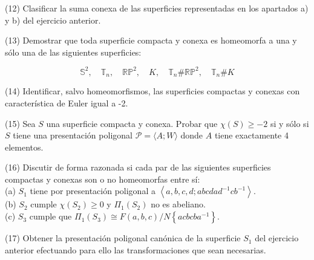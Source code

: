 \documentclass[
  a4paper,
  spanish,
  12pt,
]{scrartcl}
\begin{document}
\begin{ejer}
(12) Clasificar la suma conexa de las superficies representadas en los apartados a) y b) del ejercicio anterior.\\
\end{ejer}

\begin{ejer}
(13) Demostrar que toda superficie compacta y conexa es homeomorfa a una y sólo una de las siguientes superficies:

$$
\mathbb{S}^{2}, \quad \mathbb{T}_{n}, \quad \mathbb{R P}^{2}, \quad K, \quad \mathbb{T}_{n} \# \mathbb{R} \mathbb{P}^{2}, \quad \mathbb{T}_{n} \# K
$$
\end{ejer}

\begin{ejer}
(14) Identificar, salvo homeomorfismos, las superficies compactas y conexas con característica de Euler igual a -2.\\
\end{ejer}

\begin{ejer}
(15) Sea $S$ una superficie compacta y conexa. Probar que $\chi(S) \geq-2$ si y sólo si $S$ tiene una presentación poligonal $\mathscr{P}=\langle A ; W\rangle$ donde $A$ tiene exactamente 4 elementos.\\
\end{ejer}

\begin{ejer}
(16) Discutir de forma razonada si cada par de las siguientes superficies compactas y conexas son o no homeomorfas entre sí:\\
(a) $S_{1}$ tiene por presentación poligonal a $\left\langle a, b, c, d ; a b c d a d^{-1} c b^{-1}\right\rangle$.\\
(b) $S_{2}$ cumple $\chi\left(S_{2}\right) \geq 0$ y $\Pi_{1}\left(S_{2}\right)$ no es abeliano.\\
(c) $S_{3}$ cumple que $\Pi_{1}\left(S_{3}\right) \cong F(a, b, c) / N\left\{a c b c b a^{-1}\right\}$.\\
\end{ejer}

\begin{ejer}
(17) Obtener la presentación poligonal canónica de la superficie $S_{1}$ del ejercicio anterior efectuando para ello las transformaciones que sean necesarias.\\
\end{ejer}
\end{document}

